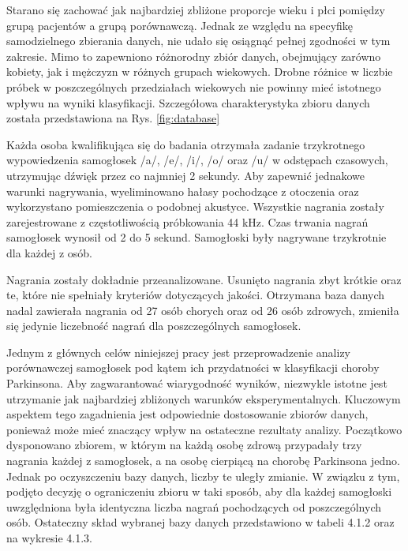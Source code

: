 Starano się zachować jak najbardziej zbliżone proporcje wieku i płci pomiędzy grupą
pacjentów a grupą porównawczą.
Jednak ze względu na specyfikę samodzielnego zbierania danych, nie udało się osiągnąć pełnej zgodności w tym zakresie.
Mimo to zapewniono różnorodny zbiór danych, obejmujący zarówno kobiety, jak i mężczyzn w różnych grupach wiekowych.
Drobne różnice w liczbie próbek w poszczególnych przedziałach wiekowych nie powinny mieć istotnego wpływu na wyniki
klasyfikacji.
Szczegółowa charakterystyka zbioru danych została przedstawiona na Rys. \ref{fig:database}

Każda osoba kwalifikująca się do badania otrzymała zadanie trzykrotnego wypowiedzenia
samogłosek /a/, /e/, /i/, /o/ oraz /u/ w odstępach czasowych, utrzymując dźwięk przez co najmniej 2 sekundy.
Aby zapewnić jednakowe warunki nagrywania, wyeliminowano hałasy pochodzące z
otoczenia oraz wykorzystano pomieszczenia o podobnej akustyce.
Wszystkie nagrania zostały zarejestrowane z częstotliwością próbkowania 44 kHz.
Czas trwania nagrań samogłosek wynosił od 2 do 5 sekund.
Samogłoski były nagrywane trzykrotnie dla każdej z osób.

Nagrania zostały dokładnie przeanalizowane.
Usunięto nagrania zbyt krótkie oraz te, które nie spełniały kryteriów dotyczących jakości.
Otrzymana baza danych nadal zawierała nagrania od 27 osób chorych oraz od 26 osób zdrowych, zmieniła się jedynie liczebność nagrań dla poszczególnych
samogłosek.

Jednym z głównych celów niniejszej pracy jest przeprowadzenie analizy porównawczej
samogłosek pod kątem ich przydatności w klasyfikacji choroby Parkinsona.
Aby zagwarantować wiarygodność wyników, niezwykle istotne jest utrzymanie jak najbardziej zbliżonych warunków
eksperymentalnych.
Kluczowym aspektem tego zagadnienia jest odpowiednie dostosowanie zbiorów
danych, ponieważ może mieć znaczący wpływ na ostateczne rezultaty analizy.
Początkowo dysponowano zbiorem, w którym na każdą osobę zdrową przypadały trzy nagrania każdej z samogłosek, a na osobę cierpiącą na chorobę Parkinsona jedno.
Jednak po oczyszczeniu bazy danych, liczby te uległy zmianie.
W związku z tym, podjęto decyzję o ograniczeniu zbioru w taki sposób, aby dla każdej samogłoski uwzględniona była
identyczna liczba nagrań pochodzących od poszczególnych osób. Ostateczny skład wybranej bazy
danych przedstawiono w tabeli 4.1.2 oraz na wykresie 4.1.3.


